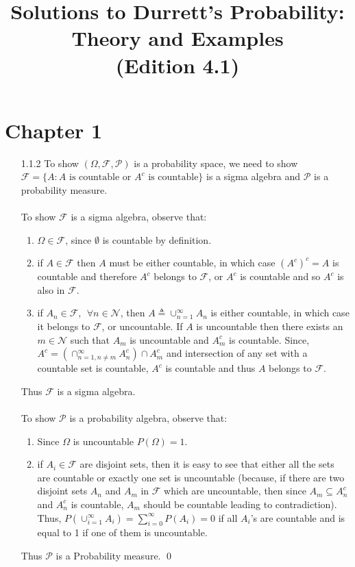 \documentclass[a4paper,english,10pt]{article}
\title{Solutions to Durrett's Probability: Theory and Examples \\(Edition 4.1)}
\date{}
\begin{document}
\maketitle
\section*{Chapter 1}
\begin{enumerate}
\item[1.1.2 ]
\proof
To show $(\Omega, \mathcal{F}, \mathcal{P})$ is a probability space, we need to show $\mathcal{F} = \lbrace{A: A \text{ is countable or } A^c \text{ is countable}\rbrace}$ is a sigma algebra and $\mathcal{P}$ is a probability measure.\\\\
To show $\mathcal{F}$ is a sigma algebra, observe that:
\begin{enumerate}
\item
$\Omega \in \mathcal{F}$, since $\emptyset$ is countable by definition.
\item
if $A\in \mathcal{F}$ then $A$ must be either countable, in which case $(A^c)^c = A$ is countable and therefore $A^c$ belongs to $\mathcal{F}$, or $A^c$ is countable and so $A^c$ is also in $\mathcal{F}$.
\item
if $A_n \in \mathcal{F}, ~~\forall n \in \mathcal{N}$, then $A \triangleq \cup_{n=1}^\infty A_n$ is either countable, in which case it belongs to $\mathcal{F}$, or uncountable. If $A$ is uncountable then there exists an $m\in \mathcal{N}$ such that $A_m$ is uncountable and $A_m^c$ is countable. Since,  $A^c = (\cap_{n=1,n\neq m}^\infty A_n^c) \cap A_m^c$ and intersection of any set with a countable set is countable, $A^c$ is countable and thus $A$ belongs to $\mathcal{F}$.
\end{enumerate}
Thus $\mathcal{F}$ is a sigma algebra.\\\\
To show $\mathcal{P}$ is a probability algebra, observe that:
\begin{enumerate}
\item
Since $\Omega$ is uncountable $P(\Omega) = 1$.
\item
if $A_i \in \mathcal{F}$ are disjoint sets, then it is easy to see that either all the sets are countable or exactly one set is uncountable (because, if there are two disjoint sets $A_n$ and $A_m$ in $\mathcal{F}$ which are uncountable, then since $A_m \subseteq A_n^c$ and $A_n^c$ is countable, $A_m$ should be countable leading to contradiction). Thus, $P(\cup_{i=1}^\infty A_i) = \sum_{i=0}^{\infty} P(A_i) = 0$ if all $A_i$'s are countable and is equal to 1 if one of them is uncountable.
\end{enumerate}
Thus $\mathcal{P}$ is a Probability measure. 
\qed
\end{enumerate}
\end{document}
